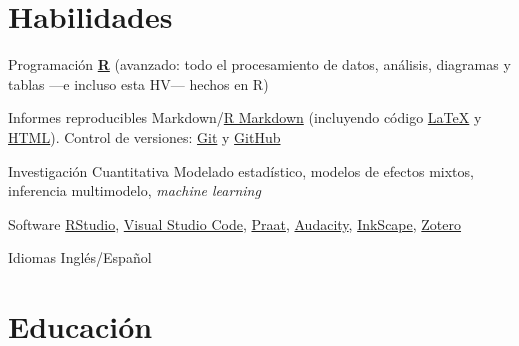 \documentclass[11pt,a4paper,]{awesome-cv}
\begin{document}
\section{Habilidades}\label{habilidades}

\begin{cvskills}
  \cvskill
    {Programación}
    {\href{https://www.r-project.org/}{\textbf{R}} (avanzado: todo el procesamiento de datos, análisis, diagramas y tablas —e incluso esta HV— hechos en R)}

  \cvskill
    {Informes reproducibles}
    {Markdown/\href{https://rmarkdown.rstudio.com/}{R Markdown} (incluyendo código  \href{https://www.latex-project.org/}{{\selectfont\LaTeX}} y \href{https://html.spec.whatwg.org/}{HTML}). Control de versiones: \href{https://git-scm.com/}{Git} \faGit* y \href{https://github.com/JDLeongomez}{GitHub} \faGithub}

  \cvskill
    {Investigación Cuantitativa}
    {Modelado estadístico, modelos de efectos mixtos, inferencia multimodelo, \textit{machine learning}}

  \cvskill
    {Software}
    {\href{https://posit.co/products/open-source/rstudio/}{RStudio}, \href{https://code.visualstudio.com/}{Visual Studio Code}, \href{https://www.fon.hum.uva.nl/praat/}{Praat}, \href{https://www.audacityteam.org/}{Audacity}, \href{https://inkscape.org/}{InkScape}, \href{https://www.zotero.org/}{Zotero}}

  \cvskill
    {Idiomas}
    {Inglés/Español}
\end{cvskills}

\section{Educación}\label{educaciuxf3n}

\begin{cventries}
    \vspace{-4.0mm}
    \vspace{-4.0mm}
    \vspace{-4.0mm}
\end{cventries}
\end{document}
